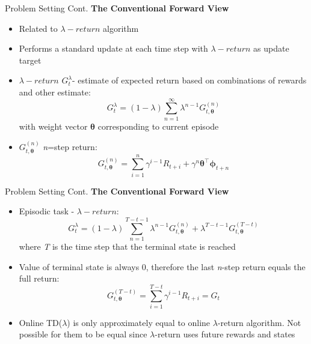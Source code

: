 \documentclass[xcolor={table}]{beamer}
\begin{document}
\begin{frame}{Problem Setting Cont.}
    \textbf{The Conventional Forward View}
    \begin{itemize}
        \item Related to $\lambda-return$ algorithm
        \item Performs a standard update at each time step with $\lambda-return$ as update target
        \item $\lambda-return$ $G_{t}^{\lambda}$- estimate of expected return based on combinations of rewards and other estimate:
        \begin{equation*}
            G_{t}^{\lambda} = (1-\lambda)\sum_{n=1}^{\infty }\lambda^{n-1}G_{t,\boldsymbol{\theta}}^{(n)}
        \end{equation*}
        with weight vector $\boldsymbol{\theta}$ corresponding to current episode
        \item $G_{t,\boldsymbol{\theta}}^{(n)}$ \textit{n}=step return:
        \begin{equation*}
            G_{t,\boldsymbol{\theta}}^{(n)} = \sum_{i=1}^{n}\gamma^{i-1}R_{t+i} + \gamma^{n}\boldsymbol{\theta}^{\top}\boldsymbol{\phi}_{t+n }
        \end{equation*}
    \end{itemize}
\end{frame}

\begin{frame}{Problem Setting Cont.}
    \textbf{The Conventional Forward View}
    \begin{itemize}
        \item Episodic task - $\lambda-return$:
        \begin{equation*}
            G_{t}^{\lambda} = (1-\lambda)\sum_{n=1}^{T-t-1}\lambda^{n-1}G_{t,\boldsymbol{\theta}}^{(n)} + \lambda^{T-t-1}G_{t,\boldsymbol{\theta}}^{(T-t)}
        \end{equation*}
        where \textit{T} is the time step that the terminal state is reached
        \item Value of terminal state is always 0, therefore the last \textit{n}-step return equals the full return:
        \begin{equation*}
            G_{t,\boldsymbol{\theta}}^{(T-t)} = \sum_{i=1}^{T-t}\gamma^{i-1}R_{t+i} = G_{t}
        \end{equation*}
        \item Online TD($\lambda$) is only approximately equal to online $\lambda$-return algorithm. Not possible for them to be equal since $\lambda$-return uses future rewards and states
    \end{itemize}
\end{frame}
\end{document}
